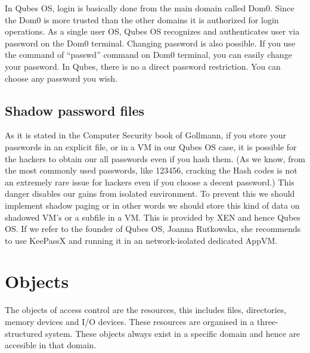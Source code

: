 \documentclass[runningheads,a4paper]{article}
\begin{document}
In Qubes OS, login is basically done
from the main domain called Dom0.  Since the Dom0 is more trusted than
the other domains it is authorized for login operations.  As a single
user OS, Qubes OS recognizes and authenticates user via password on
the Dom0 terminal.  Changing password is also possible.  If you use
the command of “passwd” command on Dom0 terminal, you can easily
change your password.  In Qubes, there is no a direct password
restriction.  You can choose any password you wish.

\subsection{Shadow password files} 

As it is stated in the Computer
Security book of Gollmann, if you store your passwords in an explicit
file, or in a VM in our Qubes OS case, it is possible for the hackers
to obtain our all passwords even if you hash them.  (As we know, from
the most commonly used passwords, like 123456, cracking the Hash codes
is not an extremely rare issue for hackers even if you choose a decent
password.)  This danger disables our gains from isolated environment.
To prevent this we should implement shadow paging or in other words we
should store this kind of data on shadowed VM’s or a subfile in a VM.
This is provided by XEN and hence Qubes OS.  If we refer to the
founder of Qubes OS, Joanna Rutkowska, she recommends to use KeePassX
and running it in an network-isolated dedicated AppVM.

\section{Objects}

The objects of access control are the resources, this includes files, directories,
memory devices and I/O devices. These resources are organised in a
three-structured system.  These objects always exist
in a specific domain and hence are accesible in that domain. 
\end{document}
